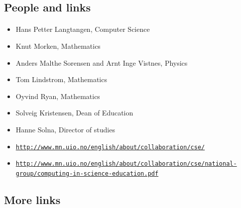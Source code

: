 \documentclass[%
twoside,                 %
final,                   %
10pt]{article}
\begin{document}
\noindent




\subsection{People and links}

\paragraph{}
\begin{itemize}
\item Hans Petter Langtangen, Computer Science

\item Knut Morken, Mathematics

\item Anders Malthe Sorensen and Arnt Inge Vistnes, Physics

\item Tom Lindstrom, Mathematics

\item Oyvind Ryan, Mathematics

\item Solveig Kristensen, Dean of Education

\item Hanne Solna, Director of studies

\item \href{{http://www.mn.uio.no/english/about/collaboration/cse/}}{\nolinkurl{http://www.mn.uio.no/english/about/collaboration/cse/}}

\item \href{{http://www.mn.uio.no/english/about/collaboration/cse/national-group/computing-in-science-education.pdf}}{\nolinkurl{http://www.mn.uio.no/english/about/collaboration/cse/national-group/computing-in-science-education.pdf}}
\end{itemize}

\noindent




\subsection{More links}

\end{document}
